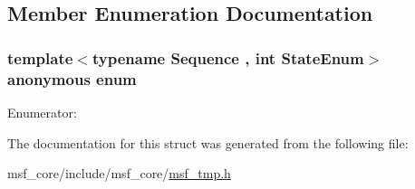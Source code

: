 \subsection{Member Enumeration Documentation}
\hypertarget{structmsf__tmp_1_1getStartIndexInCorrection_a573f82f852b11b0d055388ec3fb88a60}{\subsubsection[{anonymous enum}]{\setlength{\rightskip}{0pt plus 5cm}template$<$typename Sequence , int State\-Enum$>$ anonymous enum}}\label{structmsf__tmp_1_1getStartIndexInCorrection_a573f82f852b11b0d055388ec3fb88a60}
\begin{Desc}
\item[Enumerator\-: ]\par
\begin{description}
\item[{\em 
\hypertarget{structmsf__tmp_1_1getStartIndexInCorrection_a573f82f852b11b0d055388ec3fb88a60a93a3edb802d7fab36bba5b063ca72f01}{value}\label{structmsf__tmp_1_1getStartIndexInCorrection_a573f82f852b11b0d055388ec3fb88a60a93a3edb802d7fab36bba5b063ca72f01}
}]\end{description}
\end{Desc}



The documentation for this struct was generated from the following file\-:\begin{DoxyCompactItemize}
\item 
msf\-\_\-core/include/msf\-\_\-core/\hyperlink{msf__tmp_8h}{msf\-\_\-tmp.\-h}\end{DoxyCompactItemize}
